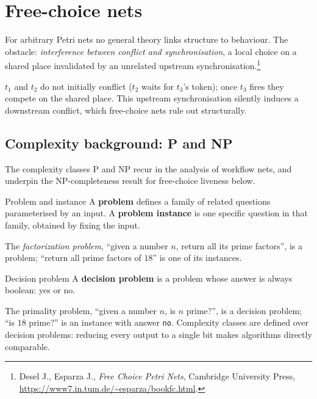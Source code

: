 \section{Free-choice nets}

For arbitrary Petri nets no general theory links structure to behaviour. The obstacle: \emph{interference between conflict and synchronisation}, a local choice on a shared place invalidated by an unrelated upstream synchronisation.\footnote{Desel J., Esparza J., \emph{Free Choice Petri Nets}, Cambridge University Press, \url{https://www7.in.tum.de/~esparza/bookfc.html}.}
\begin{center}
\end{center}
$t_1$ and $t_2$ do not initially conflict ($t_2$ waits for $t_3$'s token); once $t_3$ fires they compete on the shared place. This upstream synchronisation silently induces a downstream conflict, which free-choice nets rule out structurally.

\subsection{Complexity background: P and NP}

The complexity classes $\mathrm{P}$ and $\mathrm{NP}$ recur in the analysis of workflow nets, and underpin the $\mathrm{NP}$-completeness result for free-choice liveness below.
\begin{definitionbox}{Problem and instance}
A \textbf{problem} defines a family of related questions parameterised by an input. A \textbf{problem instance} is one specific question in that family, obtained by fixing the input.
\end{definitionbox}
The \emph{factorization problem}, ``given a number $n$, return all its prime factors'', is a problem; ``return all prime factors of $18$'' is one of its instances.
\begin{definitionbox}{Decision problem}
A \textbf{decision problem} is a problem whose answer is always boolean: yes or no.
\end{definitionbox}
The primality problem, ``given a number $n$, is $n$ prime?'', is a decision problem; ``is $18$ prime?'' is an instance with answer \texttt{no}. Complexity classes are defined over decision problems: reducing every output to a single bit makes algorithms directly comparable.


